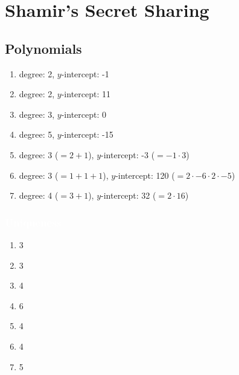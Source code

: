 \section{Shamir's Secret Sharing}

\subsection{Polynomials}
\begin{answer}
    \renewcommand{\labelenumi}{(\alph{enumi})} 
    \begin{enumerate}
        \item degree: 2, $y$-intercept: -1
        \item degree: 2, $y$-intercept: 11
        \item degree: 3, $y$-intercept: 0
        \item degree: 5, $y$-intercept: -15
        \item degree: 3 ($=2+1$), $y$-intercept: -3 ($=-1 \cdot 3$)
        \item degree: 3 ($=1+1+1$), $y$-intercept: 120 ($=2 \cdot -6 \cdot 2 \cdot -5$) 
        \item degree: 4 ($=3+1$), $y$-intercept: 32 ($=2 \cdot 16$)
    \end{enumerate}
\end{answer}

\newcommand{\hide}[1]{\textcolor{white}{#1}\vspace{-6em}}
\hide{\subsubsection{Uniqueness}}
\begin{answer}
    \renewcommand{\labelenumi}{(\alph{enumi})} 
    \begin{enumerate}
        \item 3
        \item 3
        \item 4
        \item 6
        \item 4
        \item 4
        \item 5
    \end{enumerate}
\end{answer}

